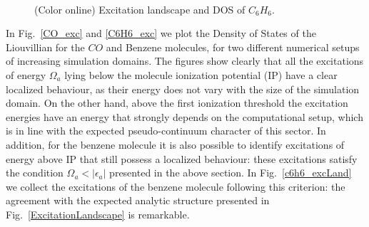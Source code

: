 \documentclass[reprint,aps,prb]{revtex4-1}
\newcommand{\eps}{\epsilon}
\begin{document}
\begin{figure}[ht]
\centering
{} \\
\centering
{}
\caption{(Color online) Excitation landscape and DOS of $C_6H_6$.}
\end{figure}


In Fig.~\ref{CO_exc} and \ref{C6H6_exc} we plot the Density of States of the Liouvillian for the $CO$  and Benzene molecules, 
for two different numerical setups of increasing simulation domains. 
The figures show clearly that all the excitations of energy $\Omega_a$ lying below the 
molecule ionization potential (IP) have a clear localized behaviour, as their energy does not vary with the size of the simulation domain.
On the other hand, above the first ionization threshold the excitation energies have an energy that strongly depends on the computational
setup, which is in line with the expected pseudo-continuum character of this sector. 
In addition, for the benzene molecule it is also possible to 
identify excitations of energy above IP that still possess a localized behaviour: these excitations satisfy the
condition $\Omega_a < |\eps_a|$ presented in the above section.
In Fig.~\ref{c6h6_excLand} we collect the excitations of the benzene molecule following this criterion:
the agreement with the expected analytic structure presented in Fig.~\ref{ExcitationLandscape} is remarkable.
\end{document}
